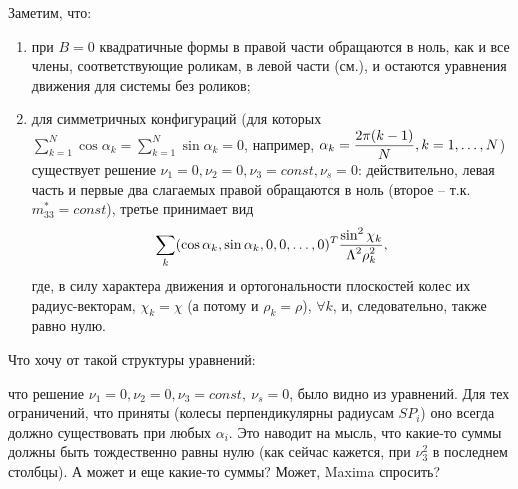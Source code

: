 Заметим, что:
\begin{enumerate}
    \item при $B = 0$ квадратичные формы в правой части обращаются в ноль, как и все члены, соответствующие роликам, в левой части (см.), и остаются уравнения движения для системы без роликов;

    \item для симметричных конфигураций (для которых $\sum_{k=1}^N\cos\alpha_k = \sum_{k=1}^N\sin\alpha_k = 0$, например, $\alpha_k = \displaystyle\frac{\displaystyle 2\pi (k-1)}{\displaystyle N}, k = 1,\ldots,N$) существует решение $\nu_1= 0, \nu_2 = 0, \nu_3 = const, \nu_s = 0$: действительно, левая часть и первые два слагаемых правой обращаются в ноль (второе -- т.к. $m^*_{33} = const$), третье принимает вид
    $$\sum_{k}(\cos\alpha_k, \sin\alpha_k, 0, 0, \ldots, 0)^T\displaystyle\frac{\displaystyle \sin^2\chi_k}{\displaystyle \Lambda^2\rho^2_k},$$
    где, в силу характера движения и ортогональности плоскостей колес их радиус-векторам, $\chi_k = \chi$ (а потому и $\rho_k = \rho$), $\forall k$, и, следовательно, также равно нулю.

\end{enumerate}


Что хочу от такой структуры уравнений:

что решение $\nu_1= 0, \nu_2 = 0, \nu_3 = const,\ \nu_s = 0$, было видно из уравнений. Для тех ограничений, что приняты (колесы перпендикулярны радиусам $SP_i$) оно всегда должно существовать при любых $\alpha_i$. Это наводит на мысль, что какие-то суммы должны быть тождественно равны нулю (как сейчас кажется, при $\nu_3^2$ в последнем столбцы). А может и еще какие-то суммы? Может, Maxima спросить?
